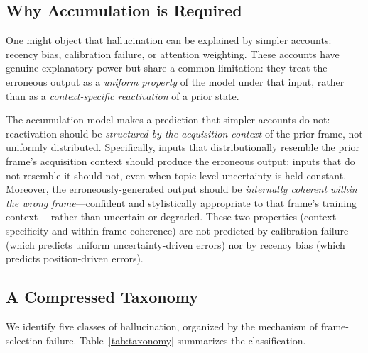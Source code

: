 \documentclass[12pt]{article}
\begin{document}
\subsection{Why Accumulation is Required}

One might object that hallucination can be explained by simpler accounts:
recency bias, calibration failure, or attention weighting.
These accounts have genuine explanatory power but share a common
limitation: they treat the erroneous output as a \emph{uniform property}
of the model under that input, rather than as a \emph{context-specific
reactivation} of a prior state.

The accumulation model makes a prediction that simpler accounts do not:
reactivation should be \emph{structured by the acquisition context} of
the prior frame, not uniformly distributed.
Specifically, inputs that distributionally resemble the prior frame's
acquisition context should produce the erroneous output; inputs that
do not resemble it should not, even when topic-level uncertainty
is held constant.
Moreover, the erroneously-generated output should be
\emph{internally coherent within the wrong frame}---confident
and stylistically appropriate to that frame's training context---
rather than uncertain or degraded.
These two properties (context-specificity and within-frame coherence)
are not predicted by calibration failure (which predicts uniform
uncertainty-driven errors) nor by recency bias (which predicts
position-driven errors).

\subsection{A Compressed Taxonomy}

We identify five classes of hallucination, organized by the
mechanism of frame-selection failure.
Table~\ref{tab:taxonomy} summarizes the classification.
\end{document}
